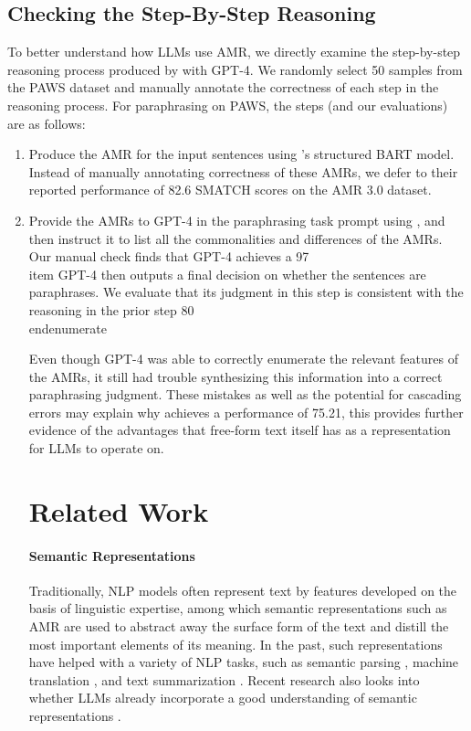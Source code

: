 \subsection{Checking the Step-By-Step Reasoning}
\label{sec:step}
To better understand how LLMs use AMR, we directly examine the step-by-step reasoning process produced by \ourmodel with GPT-4.
We randomly select 50 samples from the PAWS dataset and manually annotate the correctness of each step in the reasoning process.
For paraphrasing on PAWS, the steps (and our evaluations) are as follows:
\begin{enumerate}
\item Produce the AMR for the input sentences using \citet{drozdov2022inducing}'s structured BART model. Instead of manually annotating correctness of these AMRs, we defer to their reported performance of 82.6 SMATCH scores on the AMR 3.0 dataset.
\item Provide the AMRs to GPT-4 in the paraphrasing task prompt using \ourmodel, and then instruct it to list all the commonalities and differences of the AMRs. Our manual check finds that GPT-4 achieves a 97\\item GPT-4 then outputs a final decision on whether the sentences are paraphrases. We evaluate that its judgment in this step is consistent with the reasoning in the prior step 80\\end{enumerate}

Even though GPT-4 was able to correctly enumerate the relevant features of the AMRs, it still had trouble synthesizing this information into a correct paraphrasing judgment.
These mistakes as well as the potential for cascading errors may explain why \ourmodel achieves a performance of 75.21\Overall, this provides further evidence of the advantages that free-form text itself has as a representation for LLMs to operate on.
















\section{Related  Work}
\paragraph{Semantic Representations}
Traditionally, NLP models often represent text by features developed on the basis of linguistic expertise, among which semantic representations such as AMR \cite{banarescu2013abstract} are used to abstract away the surface form of the text and distill the most important elements of its meaning. In the past, such representations have helped with a variety of NLP tasks, such as
semantic parsing \citep{kuhn1995the}, machine translation \citep{wu2009semantic,wong2006learning}, and text summarization \citep{liu2018toward}. 
Recent research also looks into whether LLMs already incorporate a good understanding of semantic representations
\cite[e.g.,][]{staliunaite-iacobacci-2020-compositional,blevins-etal-2023-prompting}.


\end{enumerate}
